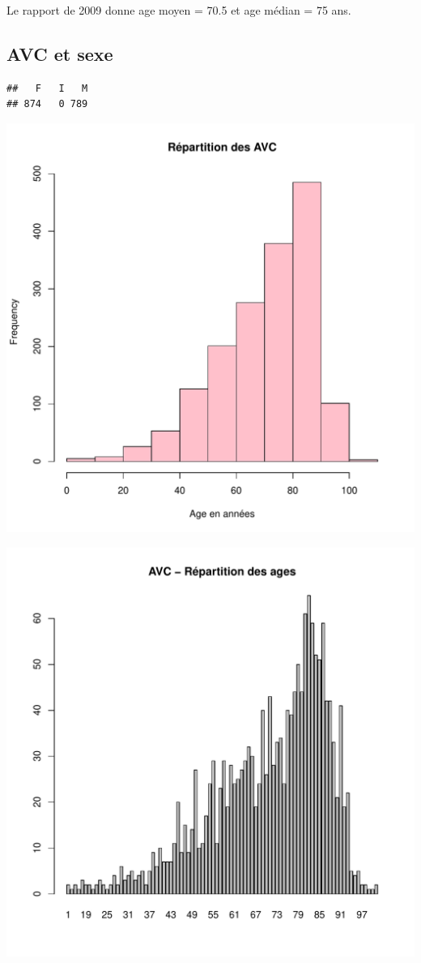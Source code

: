 \documentclass[12pt,english,french,twoside]{report}\usepackage[]{graphicx}\usepackage[]{color}
\makeatletter
\def\maxwidth{ %
  \ifdim\Gin@nat@width>\linewidth
    \linewidth
  \else
    \Gin@nat@width
  \fi
}
\newenvironment{kframe}{%
 \def\at@end@of@kframe{}%
 \ifinner\ifhmode%
  \def\at@end@of@kframe{\end{minipage}}%
  \begin{minipage}{\columnwidth}%
 \fi\fi%
 \def\FrameCommand##1{\hskip\@totalleftmargin \hskip-\fboxsep
 \colorbox{shadecolor}{##1}\hskip-\fboxsep
     \hskip-\linewidth \hskip-\@totalleftmargin \hskip\columnwidth}%
 \MakeFramed {\advance\hsize-\width
   \@totalleftmargin\z@ \linewidth\hsize
   \@setminipage}}%
 {\par\unskip\endMakeFramed%
 \at@end@of@kframe}
\newenvironment{knitrout}{}{} %
\makeatother
\begin{document}
Le rapport de 2009 donne age moyen = 70.5 et age médian = 75 ans.

\subsection*{AVC et sexe}
\begin{knitrout}
\color{fgcolor}\begin{kframe}
\begin{verbatim}
##   F   I   M 
## 874   0 789
\end{verbatim}
\end{kframe}
\includegraphics[width=\maxwidth]{figure/avc_sexe1} 

\includegraphics[width=\maxwidth]{figure/avc_sexe2} 


\end{knitrout}
\end{document}
